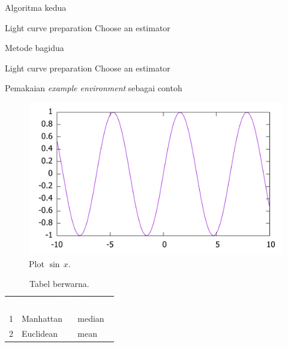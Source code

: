 \documentclass[12pt,justified,a4paper,twoside,symmetric,titlepage]{tufte-book}
\begin{document}
\begin{algorithm}
\caption{Algoritma kedua}
\label{algKedua}

\begin{algorithmic}[1]
\STATE Light curve preparation
\STATE Choose an estimator
\end{algorithmic}
\end{algorithm}

\lipsum[1-3]

\begin{algorithm}
\caption{Metode bagidua}
\label{algContoh}

\begin{algorithmic}[1]
\STATE Light curve preparation
\STATE Choose an estimator
\end{algorithmic}
\end{algorithm}

\begin{example}
\caption{Pemakaian \textit{example environment} sebagai contoh}
\label{cthContoh}

\lipsum[3]
\end{example}

\begin{figure}
\label{gbrContoh}
\begin{center}
\includegraphics[width=\textwidth]{plotsinus.pdf}
\end{center}
\caption{Plot $\sin\,x$.}
\end{figure}

\lipsum[4-6]

\begin{table}
\label{tabContoh}
\caption{Tabel berwarna.}
\begin{center}
\begin{tabular}{cll}
\rowcolor{darkgray}\multicolumn{1}{c}{\textcolor{white}{No}} & \multicolumn{1}{c}{\textcolor{white}{Fungsi proxy}} & \multicolumn{1}{c}{\textcolor{white}{Centroid}}\\
\rowcolor{lightgray}1 & Manhattan & median\\
\rowcolor{gray}2 & Euclidean & mean
\end{tabular}
\end{center}
\end{table}
\end{document}
